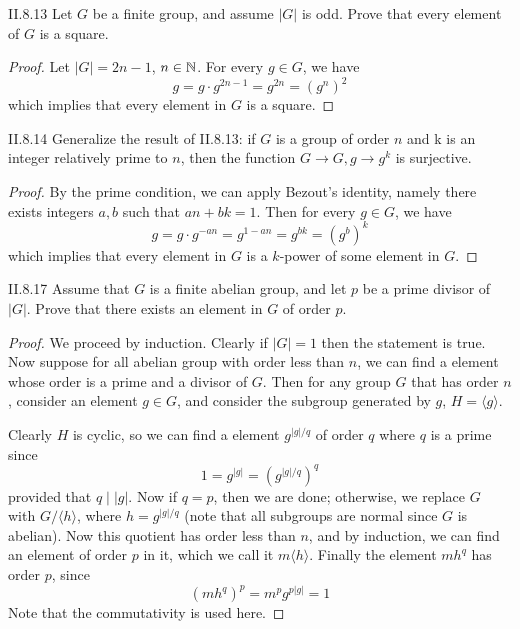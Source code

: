 \begin{problem}{II.8.13}
Let $G$ be a finite group, and assume $|G|$ is odd. Prove that every element of $G$ is a square.
\end{problem}
\begin{proof}
Let $|G|=2n-1$, $n \in \mathbb{N}$. For every $g \in G$, we have
\[
g = g \cdot g^{2n-1} = g^{2n} = (g^n)^2    
\]
which implies that every element in $G$ is a square.
\end{proof}

\begin{problem}{II.8.14}
Generalize the result of II.8.13: if $G$ is a group of order $n$ and k is an integer relatively prime to $n$, then the function $G \to G, g \to g^k$ is surjective.
\end{problem}
\begin{proof}
By the prime condition, we can apply Bezout's identity, namely there exists integers $a,b$ such that $an + bk = 1$. Then for every $g \in G$, we have
\[
g = g \cdot g^{-an} = g^{1-an} = g^{bk} = (g^b)^k    
\]
which implies that every element in $G$ is a $k$-power of some element in $G$.
\end{proof}    

\begin{problem}{II.8.17}
Assume that $G$ is a finite abelian group, and let $p$ be a prime divisor of $|G|$. Prove that there exists an element in $G$ of order $p$.
\end{problem}
\begin{proof}
We proceed by induction. Clearly if $|G| = 1$ then the statement is true. Now suppose for all abelian group with order less than $n$, we can find a element whose order is a prime and a divisor of $G$. Then for any group $G$ that has order $n$, consider an element $g \in G$, and consider the subgroup generated by $g$, $H = \langle g \rangle$. 

Clearly $H$ is cyclic, so we can find a element $g^{|g|/ q}$ of order $q$ where $q$ is a prime since
\[
1 = g^{|g|} = (g^{|g|/ q})^q
\]
provided that $q\;|\;|g|$. Now if $q = p$, then we are done; otherwise, we replace $G$ with $G/\langle h \rangle$, where $h = g^{|g|/ q}$ (note that all subgroups are normal since $G$ is abelian). Now this quotient has order less than $n$, and by induction, we can find an element of order $p$ in it, which we call it $m\langle h \rangle$. Finally the element $mh^{q}$ has order $p$, since
\[
(mh^{q})^p = m^pg^{p|g|} = 1
\]
Note that the commutativity is used here.
\end{proof}

